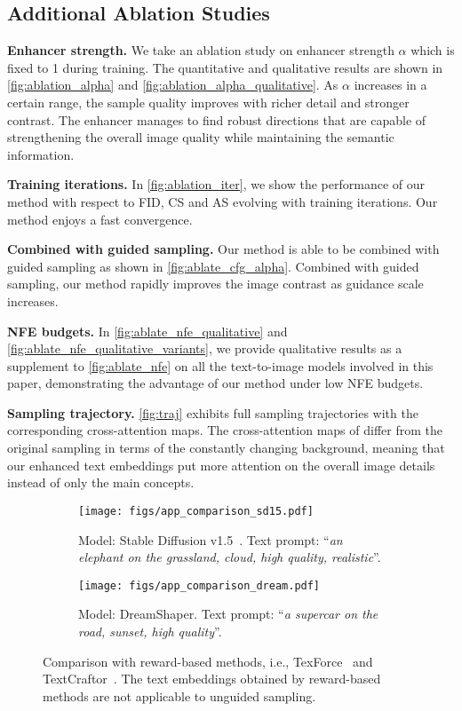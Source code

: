 \subsection{Additional Ablation Studies}
\label{sec:app_ablation}

\textbf{Enhancer strength.} 
We take an ablation study on enhancer strength $\alpha$ which is fixed to 1 during training. The quantitative and qualitative results are shown in \cref{fig:ablation_alpha} and \cref{fig:ablation_alpha_qualitative}. As $\alpha$ increases in a certain range, the sample quality improves with richer detail and stronger contrast. 
The enhancer manages to find robust directions that are capable of strengthening the overall image quality while maintaining the semantic information.

\textbf{Training iterations.}
In \cref{fig:ablation_iter}, we show the performance of our method with respect to FID, CS and AS evolving with training iterations. Our method enjoys a fast convergence.

\textbf{Combined with guided sampling.} 
Our method is able to be combined with guided sampling as shown in \cref{fig:ablate_cfg_alpha}. Combined with guided sampling, our method rapidly improves the image contrast as guidance scale increases.

\textbf{NFE budgets.} 
In \cref{fig:ablate_nfe_qualitative} and \cref{fig:ablate_nfe_qualitative_variants}, we provide qualitative results as a supplement to \cref{fig:ablate_nfe} on all the text-to-image models involved in this paper, demonstrating the advantage of our method under low NFE budgets. 

\textbf{Sampling trajectory.} 
\cref{fig:traj} exhibits full sampling trajectories with the corresponding cross-attention maps. The cross-attention maps of \ourName differ from the original sampling in terms of the constantly changing background, meaning that our enhanced text embeddings put more attention on the overall image details instead of only the main concepts.



\begin{figure}[t]
\begin{center}
    \begin{subfigure}[t]{\textwidth}
        \texttt{[image: figs/app\_comparison\_sd15.pdf]}
        \caption{Model: Stable Diffusion v1.5~\cite{rombach2022ldm}. Text prompt: ``\textit{an elephant on the grassland, cloud, high quality, realistic}''.}
    \end{subfigure}
    \vskip 0.15in
    \begin{subfigure}[t]{\textwidth}
        \texttt{[image: figs/app\_comparison\_dream.pdf]}
        \caption{Model: DreamShaper. Text prompt: ``\textit{a supercar on the road, sunset, high quality}''.}
    \end{subfigure}
\caption{Comparison with reward-based methods, i.e., TexForce~\cite{chen2025enhancing} and TextCraftor~\cite{li2024textcraftor}. The text embeddings obtained by reward-based methods are not applicable to unguided sampling.}
\label{fig:app_comp}
\end{center}
\end{figure}

